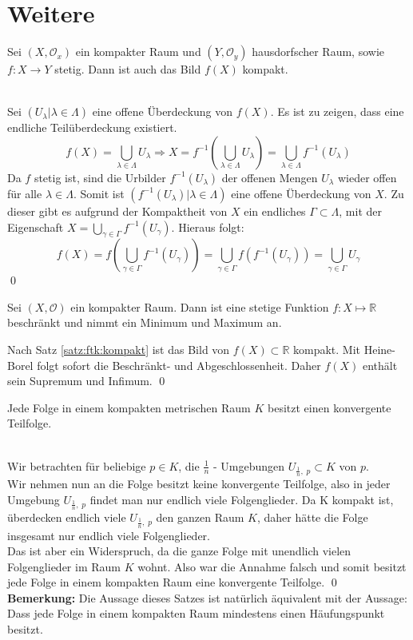 \section{Weitere}
% 
\begin{Satz}\label{satz:ftk:kompakt}
	Sei \( (X, \mathcal{O}_x) \) ein kompakter Raum und \((Y, \mathcal{O}_y)\) hausdorfscher Raum, sowie \(f: X \to Y\) stetig.
	Dann ist auch das Bild \( f(X) \) kompakt.
\end{Satz}
%
	\\
	Sei \( (U_{\lambda} | \lambda \in \Lambda) \) eine offene Überdeckung von \(f(X)\). Es ist zu zeigen,
	dass eine endliche Teilüberdeckung existiert. 
	\[ f(X) = \bigcup_{\lambda \in \Lambda} U_{\lambda} \Rightarrow X = 
  	 f^{-1}(\bigcup_{\lambda \in \Lambda} U_{\lambda}) = 
		 \bigcup_{\lambda \in \Lambda} f^{-1}(U_{\lambda}) \]
	Da \(f\) stetig ist, sind die Urbilder \( f^{-1}(U_{\lambda}) \) der offenen Mengen \(U_{\lambda}\) wieder offen für 
	alle \(\lambda \in \Lambda\). Somit ist \( ( f^{-1}(U_{\lambda}) | \lambda \in \Lambda ) \) eine offene Überdeckung
	von \(X\). Zu dieser gibt es aufgrund der Kompaktheit von \(X\) ein endliches \( \Gamma \subset \Lambda \), mit 
	der Eigenschaft \( X = \bigcup_{\gamma \in \Gamma} f^{-1}(U_{\gamma}) \). Hieraus folgt:
	\[ f(X) = f(\bigcup_{\gamma \in \Gamma} f^{-1}(U_{\gamma})) = 
  	 \bigcup_{\gamma \in \Gamma} f(f^{-1}(U_{\gamma})) = 
	   \bigcup_{\gamma \in \Gamma} U_{\gamma} \]
\qed

\begin{Satz}
	Sei \((X, \mathcal{O})\) ein kompakter Raum. Dann ist eine stetige Funktion \(f: X \mapsto \mathbb{R}\) 
	beschränkt und nimmt ein Minimum und Maximum an.
\end{Satz}
%
	Nach Satz \ref{satz:ftk:kompakt} ist das Bild von \( f(X) \subset \mathbb{R} \) kompakt. Mit Heine-Borel 
	folgt sofort die Beschränkt- und Abgeschlossenheit. Daher \(f(X)\) enthält sein Supremum und Infimum.
\qed
	\begin{Satz}
		Jede Folge in einem kompakten metrischen Raum \(K\) besitzt einen konvergente Teilfolge.
	\end{Satz}
	\\
		Wir betrachten für beliebige \( p \in K \), die \( \frac{1}{n} \) - Umgebungen \( U_{\frac{1}{n},\;p} \subset K \) von \(p \). \\
		Wir nehmen nun an die Folge besitzt keine konvergente Teilfolge, also in jeder Umgebung  \( U_{\frac{1}{n},\;p} \) findet man nur endlich viele Folgenglieder. 
		Da K kompakt ist, überdecken endlich viele  \( U_{\frac{1}{n},\;p} \) den ganzen Raum \( K \), daher hätte die Folge insgesamt nur endlich viele Folgenglieder.\\
		Das ist aber ein Widerspruch, da die ganze Folge mit unendlich vielen Folgenglieder im Raum \(K \) wohnt. Also war die Annahme falsch und somit besitzt jede Folge in einem kompakten
		Raum eine konvergente Teilfolge.
	\qed\\
	{\bf Bemerkung:} Die Aussage dieses Satzes ist natürlich äquivalent mit der Aussage: Dass jede Folge in einem kompakten Raum mindestens einen Häufungspunkt besitzt. 
	

